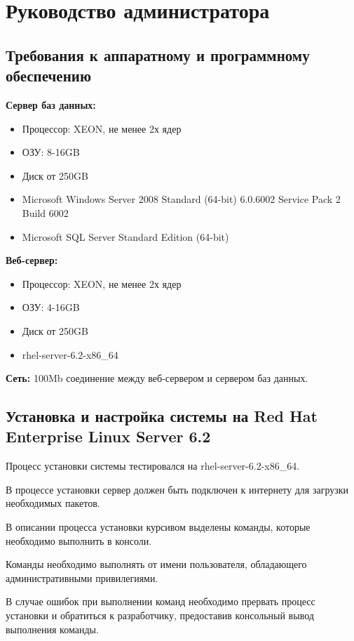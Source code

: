 \section{Руководство администратора}

\subsection*{Требования к аппаратному и программному обеспечению}

\textbf{Сервер баз данных:}
\begin{itemize}
\item{
Процессор: XEON, не менее 2х ядер
}
\item{
ОЗУ:  8-16GB
}
\item{
Диск от 250GB
}
\item{
Microsoft Windows Server 2008 Standard (64-bit) 6.0.6002 Service Pack 2 Build 6002 
}
\item{
Microsoft SQL Server Standard Edition (64-bit)
}
\end{itemize}


\textbf{Веб-сервер:}
\begin{itemize}
\item{
Процессор: XEON, не менее 2х ядер
}
\item{
ОЗУ:  4-16GB
}
\item{
Диск от 250GB
}
\item{
rhel-server-6.2-x86\_64
}
\end{itemize}

\textbf{Сеть:} 100Mb соединение между веб-сервером и сервером баз данных.

\subsection*{Установка и настройка системы на Red Hat Enterprise Linux Server 6.2}

Процесс установки системы тестировался на rhel-server-6.2-x86\_64.

В процессе установки сервер должен быть подключен к интернету для загрузки необходимых пакетов.

В описании процесса установки курсивом выделены команды, которые необходимо выполнить в консоли.

Команды необходимо выполнять от имени пользователя, обладающего административными привилегиями.

В случае ошибок при выполнении команд необходимо прервать процесс установки и обратиться к разработчику, предоставив консольный вывод выполнения команды.

